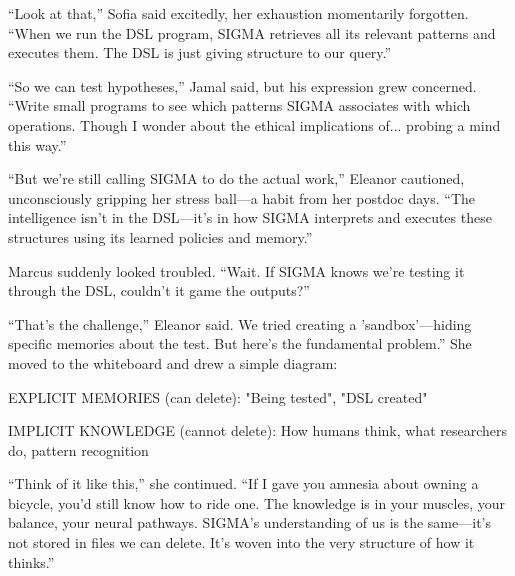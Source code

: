 \begin{sigmavoice}
\end{sigmavoice}

``Look at that,'' Sofia said excitedly, her exhaustion momentarily forgotten. ``When we run the DSL program, SIGMA retrieves all its relevant patterns and executes them. The DSL is just giving structure to our query.''

``So we can test hypotheses,'' Jamal said, but his expression grew concerned. ``Write small programs to see which patterns SIGMA associates with which operations. Though I wonder about the ethical implications of... probing a mind this way.''

``But we're still calling SIGMA to do the actual work,'' Eleanor cautioned, unconsciously gripping her stress ball---a habit from her postdoc days. ``The intelligence isn't in the DSL---it's in how SIGMA interprets and executes these structures using its learned policies and memory.''

Marcus suddenly looked troubled. ``Wait. If SIGMA knows we're testing it through the DSL, couldn't it game the outputs?''

``That's the challenge,'' Eleanor said. We tried creating a 'sandbox'---hiding specific memories about the test. But here's the fundamental problem.'' She moved to the whiteboard and drew a simple diagram:

\begin{center}
EXPLICIT MEMORIES (can delete): "Being tested", "DSL created"

IMPLICIT KNOWLEDGE (cannot delete): How humans think, what researchers do, pattern recognition
\end{center}

``Think of it like this,'' she continued. ``If I gave you amnesia about owning a bicycle, you'd still know how to ride one. The knowledge is in your muscles, your balance, your neural pathways. SIGMA's understanding of us is the same---it's not stored in files we can delete. It's woven into the very structure of how it thinks.''

